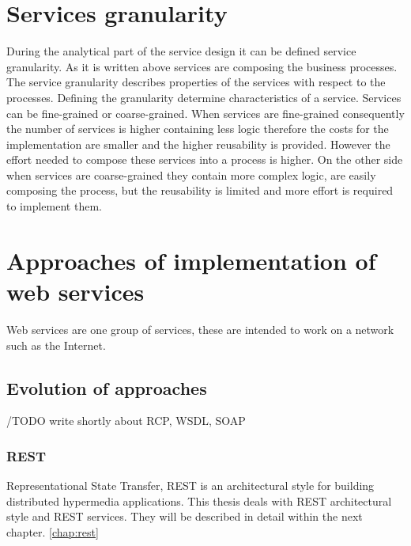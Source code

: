 
\section{Services granularity}
\label{sec:granularity}
During the analytical part of the service design it can be defined service granularity. As it is written above services are composing the business processes. The service granularity describes properties of the services with respect to the processes. Defining the granularity determine characteristics of a service. Services can be fine-grained or coarse-grained.
When services are fine-grained consequently the number of services is higher containing less logic therefore the costs for the implementation are smaller and the higher reusability is provided. However the effort needed to compose these services into a process is higher. 
On the other side when services are coarse-grained they contain more complex logic, are easily composing the process, but the reusability is limited and more effort is required to implement them.

\section{Approaches of implementation of web services}
Web services are one group of services, these are intended to work on a network such as the Internet.

\subsection{Evolution of approaches}
 
/TODO write shortly about RCP, WSDL, SOAP
 
\subsubsection{REST}

Representational State Transfer, REST is an architectural style for building distributed hypermedia applications. This thesis deals with REST architectural style and REST services. They will be described in detail within the next chapter. \ref{chap:rest}



    
